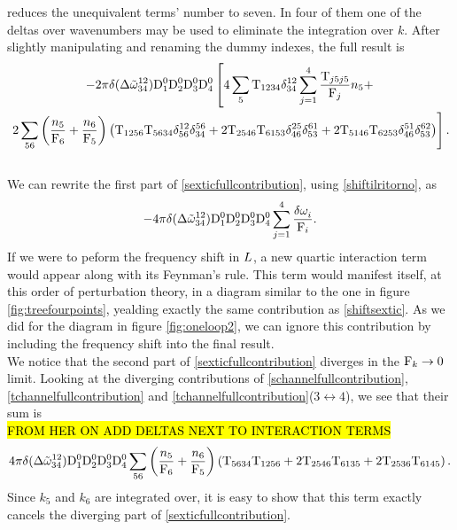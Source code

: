 reduces the unequivalent terms' number to seven. In four of them one of the deltas over wavenumbers may be used to eliminate the integration over $k$. After slightly manipulating
and renaming the dummy indexes, the full result is 
\begin{multline}
    -2\pi \delta(\Delta{\tilde{\omega}}^{12}_{34})\mathrm{D}_1^0\mathrm{D}_2^0\mathrm{D}_3^0\mathrm{D}_4^0\left[ 4\sum_5\mathrm{T}_{1234}\delta^{12}_{34} \sum_{j=1}^{4}\frac{\mathrm{T}_{j5j5}}{\mathrm{F}_j}n_5 + \right.\\ 
    \left.  2\sum_{56}\left( \frac{n_5}{\mathrm{F}_6} + \frac{n_6}{\mathrm{F}_5} \right)\left( \mathrm{T}_{1256}\mathrm{T}_{5634}\delta^{12}_{56}\delta^{56}_{34} 
    + 2\mathrm{T}_{2546}\mathrm{T}_{6153}\delta^{25}_{46}\delta^{61}_{53}
    + 2\mathrm{T}_{5146}\mathrm{T}_{6253}\delta^{51}_{46}\delta^{62}_{53} \right) \right].
    \label{sexticfullcontribution}
\end{multline}
\\
We can rewrite the first part of \eqref{sexticfullcontribution}, using \eqref{shiftilritorno}, as 
\begin{equation}
    -4\pi \delta(\Delta{\tilde{\omega}}^{12}_{34})\mathrm{D}_1^0\mathrm{D}_2^0\mathrm{D}_3^0\mathrm{D}_4^0\sum_{j=1}^{4}\frac{\delta \omega^{}_i}{\mathrm{F}_i}.
    \label{shiftsextic}
\end{equation}
If we were to peform the frequency shift in $L$, a new quartic interaction term would appear along with its Feynman's rule. 
This term would manifest itself, at this order of perturbation theory, in a diagram similar to the one in figure \ref{fig:treefourpoints}, 
yealding exactly the same contribution as \eqref{shiftsextic}. As we did for the diagram in figure \ref{fig:oneloop2}, we can ignore this contribution by including
the frequency shift into the final result. \\
We notice that the second part of \eqref{sexticfullcontribution} diverges in the $\mathrm{F}_k \rightarrow 0$ limit. Looking at the diverging contributions of 
\eqref{schannelfullcontribution}, \eqref{tchannelfullcontribution} and \eqref{tchannelfullcontribution}($3 \leftrightarrow 4$), we see that their sum is\\
\hl{FROM HER ON ADD DELTAS NEXT TO INTERACTION TERMS}
\begin{equation}
    4\pi\delta(\Delta{\tilde{\omega}}^{12}_{34})\mathrm{D}_1^0\mathrm{D}_2^0\mathrm{D}_3^0\mathrm{D}_4^0\sum_{56}\left( \frac{n_5}{\mathrm{F}_6} + \frac{n_6}{\mathrm{F}_5}\right)\left(
    \mathrm{T}_{5634}\mathrm{T}_{1256} + 2 \mathrm{T}_{2546}\mathrm{T}_{6135} + 2\mathrm{T}_{2536}\mathrm{T}_{6145}
    \right).
\end{equation}
Since $k_5$ and $k_6$ are integrated over, it is easy to show that this term exactly cancels the diverging part of \eqref{sexticfullcontribution}.\\
